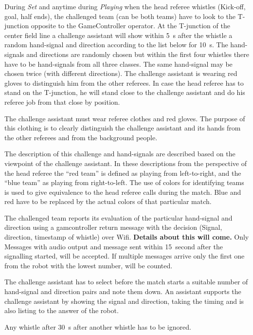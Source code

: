 During \textit{Set} and anytime during \textit{Playing} when the head referee whistles (Kick-off, goal, half ends), the challenged team (can be both teams) have to look to the T-junction opposite to the GameController operator. At the T-junction of the center field line a challenge assistant will show within \qty{5}{\second} after the whistle a random hand-signal and direction according to the list below for \qty{10}{\second}. The hand-signals and directions are randomly chosen but within the first four whistles there have to be hand-signals from all three classes. The same hand-signal may be chosen twice (with different directions). The challenge assistant is wearing red gloves to distinguish him from the other referees. In case the head referee has to stand on the T-junction, he will stand close to the challenge assistant and do his referee job from that close by position.

The challenge assistant must wear referee clothes and red gloves. The purpose of this clothing is to clearly distinguish the challenge assistant and its hands from the other referees and from the background people. 

The description of this challenge and hand-signals are described based on the viewpoint of the challenge assistant. In these descriptions from the perspective of the head referee the ``red team'' is defined as playing from left-to-right, and the ``blue team'' as playing from right-to-left. The use of colors for identifying teams is used to give equivalence to the head referee calls during the match. Blue and red have to be replaced by the actual colors of that particular match.

The challenged team reports its evaluation of the particular hand-signal and direction using a gamcontroller return message with the decision (Signal, direction, timestamp of whistle) over Wifi. \textbf{Details about this will come.} Only Messages with audio output and message sent within \qty{15}{second} after the signalling started, will be accepted. If multiple messages arrive only the first one from the robot with the lowest number, will be counted.

The challenge assistant has to select before the match starts a suitable number of hand-signal and direction pairs and note them down. An assistant supports the challenge assistant by showing the signal and direction, taking the timing and is also listing to the answer of the robot.

Any whistle after \qty{30}{\second} after another whistle has to be ignored.

